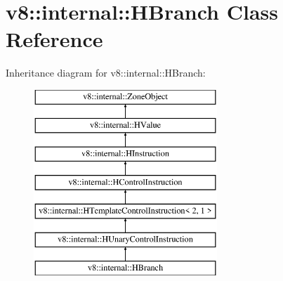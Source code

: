 \hypertarget{classv8_1_1internal_1_1_h_branch}{}\section{v8\+:\+:internal\+:\+:H\+Branch Class Reference}
\label{classv8_1_1internal_1_1_h_branch}
Inheritance diagram for v8\+:\+:internal\+:\+:H\+Branch\+:\begin{figure}[H]
\begin{center}
\leavevmode
\includegraphics[height=7.000000cm]{classv8_1_1internal_1_1_h_branch}
\end{center}
\end{figure}
